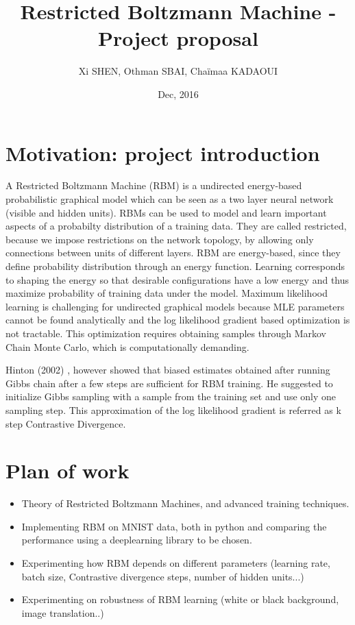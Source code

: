 \documentclass[a4paper,10pt]{article}
\author{Xi SHEN, Othman SBAI, Chaïmaa KADAOUI}
\title{Restricted Boltzmann Machine - Project proposal}
\date{Dec, 2016}
\begin{document}
\maketitle
\section{Motivation: project introduction}
A Restricted Boltzmann Machine (RBM) is a undirected energy-based probabilistic graphical model which can be seen as a two layer neural network (visible and hidden units). RBMs can be used to model and learn important aspects of a probabilty distribution of a training data. They are called restricted, because we impose restrictions on the network topology, by allowing only connections between units of different layers. RBM are energy-based, since they define probability distribution through an energy function. Learning corresponds to shaping the energy so that desirable configurations have a low energy and thus maximize probability of training data under the model. Maximum likelihood learning is challenging for undirected graphical models because MLE parameters cannot be found analytically and the log likelihood gradient based optimization is not tractable. This optimization requires obtaining samples through Markov Chain Monte Carlo, which is computationally demanding. 

Hinton (2002) \cite{praticalGuide}, however showed that biased estimates obtained after running Gibbs chain after a few steps are sufficient for RBM training. He suggested to initialize Gibbs sampling with a sample from the training set and use only one sampling step. This approximation of the log likelihood gradient is referred as k step Contrastive Divergence.


\section{Plan of work}

\begin{itemize}
	\item Theory of Restricted Boltzmann Machines, and advanced training techniques.
	\item Implementing RBM on MNIST data, both in python and comparing the performance using a deeplearning library to be chosen.
	\item Experimenting how RBM depends on different parameters (learning rate, batch size, Contrastive divergence steps, number of hidden units...)
	\item Experimenting on robustness of RBM learning (white or black background, image translation..)
\end{itemize}
\end{document}
